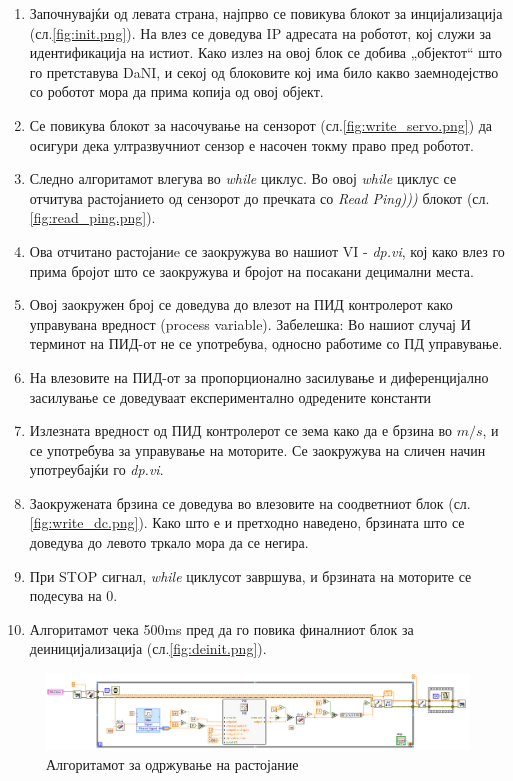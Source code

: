 \documentclass{article}
\begin{document}
\begin{enumerate}
\item Започнувајќи од левата страна, најпрво се повикува блокот за инцијализација (сл.\ref{fig:init.png}). На влез се доведува IP адресата на роботот, кој служи за идентификација на истиот. Како излез на овој блок се добива „објектот“ што го претставува DaNI, и секој од блоковите кој има било какво заемнодејство со роботот мора да прима копија од овој објект.
\item Се повикува блокот за насочување на сензорот (сл.\ref{fig:write_servo.png}) да осигури дека ултразвучниот сензор е насочен токму право пред роботот.
\item Следно алгоритамот влегува во \textit{while} циклус. Во овој \textit{while} циклус се отчитува растојанието од сензорот до пречката со \textit{Read Ping)))} блокот (сл.\ref{fig:read_ping.png}).
\item Ова отчитано растојаниe се заокружува во нашиот VI - \textit{dp.vi}, кој како влез го прима бројот што се заокружува и бројот на посакани децимални места.
\item Овој заокружен број се доведува до влезот на ПИД контролерот како управувана вредност (process variable). Забелешка: Во нашиот случај И терминот на ПИД-от не се употребува, односно работиме со ПД управување.
\item На влезовите на ПИД-от за пропорционално засилување и диференцијално засилување се доведуваат експериментално одредените константи
\item Излезната вредност од ПИД контролерот се зема како да е брзина во $m/s$, и се употребува за управување на моторите. Се заокружува на сличен начин употреубајќи го \textit{dp.vi}.
\item Заокружената брзина се доведува во влезовите на соодветниот блок (сл.\ref{fig:write_dc.png}). Како што е и претходно наведено, брзината што се доведува до левото тркало мора да се негира.
\item При STOP сигнал, \textit{while} циклусот завршува, и брзината на моторите се подесува на 0.
\item Алгоритамот чека 500ms пред да го повика финалниот блок за деиницијализација (сл.\ref{fig:deinit.png}).
\end{enumerate}

\begin{figure}[H]
\centering
\includegraphics[width=0.80\paperheight,angle=90]{PID_Control.png}
\caption{Алгоритамот за одржување на растојание}
\label{fig:PID_Control.png}
\end{figure}
\end{document}
